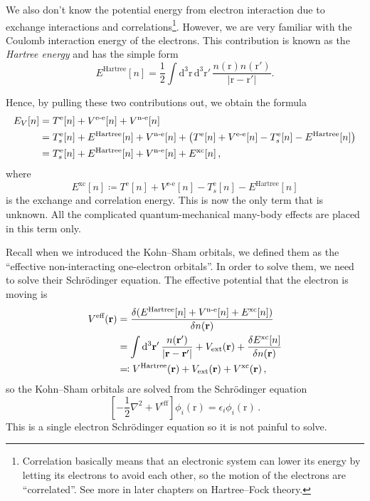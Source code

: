 \documentclass{article}
\theoremstyle{plain}\theoremheaderfont{\normalfont\itshape}\theorembodyfont{\rmfamily}\theoremseparator{.}\newtheorem*{rem}{Remark}\newtheorem*{ex}{Example}\newtheorem*{proof}{Proof}\newtheorem*{altp}{Alternative proof}
\theoremstyle{plain}\theoremheaderfont{\normalfont\bfseries}\theorembodyfont{\rmfamily}\theoremseparator{.}\newtheorem{thm}{Theorem}[section]\newtheorem{lem}[thm]{Lemma}\newtheorem{prop}[thm]{Proposition}\newtheorem*{cor}{Corollary}\newtheorem{defn}[thm]{Definition}\newtheorem{clm}[thm]{Claim}\newtheorem{clminproof}{Claim}\newtheorem{pos}{Postulate}[section]
\theoremstyle{break}\theoremheaderfont{\normalfont\itshape}\theorembodyfont{\rmfamily}\theoremseparator{.\medskip}\newtheorem*{proofskip}{Proof}\newtheorem*{exs}{Examples}\newtheorem*{rems}{Remarks}
\theoremstyle{break}\theoremheaderfont{\normalfont\bfseries}\theorembodyfont{\rmfamily}\theoremseparator{.\medskip}\newtheorem{lemskip}[thm]{Lemma}\newtheorem{defnskip}[thm]{Definition}\newtheorem{propskip}[thm]{Proposition}\newtheorem{thmskip}[thm]{Theorem}
\numberwithin{equation}{section}
\newcommand{\dd}[2][]{\mathrm{d}^{#1} #2\,}
\newcommand{\vb}[1]{\bm{\mathrm{#1}}}
\newcommand{\abs}[1]{\left| #1 \right|}
\newcommand{\laplacian}{\nabla^2}
\newcommand{\e}{^{\text{e}}}
\begin{document}
    We also don't know the potential energy from electron interaction due to exchange interactions and correlations\footnote{Correlation basically means that an electronic system can lower its energy by letting its electrons to avoid each other, so the motion of the electrons are ``correlated''. See more in later chapters on Hartree--Fock theory.}. However, we are very familiar with the Coulomb interaction energy of the electrons. This contribution is known as the \textit{Hartree energy} and has the simple form
    \begin{equation}
        E^{\text{Hartree}}[n]=\frac{1}{2}\int\dd[3]{\vb{r}}\dd[3]{\vb{r}'}\frac{n(\vb{r})n(\vb{r}')}{\abs{\vb{r}-\vb{r}'}}.
    \end{equation}

    Hence, by pulling these two contributions out, we obtain the formula
    \begin{align}
        E_V[n]&=T\e[n]+V^{\text{e-e}}[n]+V^{\text{n-e}}[n]\notag\\
        &=T_s\e[n]+E^{\text{Hartree}}[n]+V^{\text{n-e}}[n]+\left(T\e[n]+V^{\text{e-e}}[n]-T_s\e[n]-E^{\text{Hartree}}[n]\right)\notag\\
        &=T_s\e[n]+E^{\text{Hartree}}[n]+V^{\text{n-e}}[n]+E^{\text{xc}}[n]\,,
    \end{align}
    where
    \begin{equation}
        E^{\text{xc}}[n]\coloneqq T\e[n]+V^{\text{e-e}}[n]-T_s\e[n]-E^{\text{Hartree}}[n]
    \end{equation}
    is the exchange and correlation energy. This is now the only term that is unknown. All the complicated quantum-mechanical many-body effects are placed in this term only.

    Recall when we introduced the Kohn--Sham orbitals, we defined them as the ``effective non-interacting one-electron orbitals''. In order to solve them, we need to solve their Schr\"{o}dinger equation. The effective potential that the electron is moving is
    \begin{align}
        V^{\text{eff}}(\vb{r})&=\frac{\delta(E^{\text{Hartree}}[n]+V^{\text{n-e}}[n]+E^{\text{xc}}[n])}{\delta n(\vb{r})}\notag\\
        &=\int\dd[3]{\vb{r}'}\frac{n(\vb{r}')}{\abs{\vb{r}-\vb{r}'}}+V_{\text{ext}}(\vb{r})+\frac{\delta E^{\text{xc}}[n]}{\delta n(\vb{r})}\notag\\
        &\eqqcolon V^{\text{Hartree}}(\vb{r})+V_{\text{ext}}(\vb{r})+V^{\text{xc}}(\vb{r})\,,
    \end{align}
    so the Kohn--Sham orbitals are solved from the Schr\"{o}dinger equation
    \begin{equation}
        \left[-\frac{1}{2}\laplacian+V^{\text{eff}}\right]\phi_i(\vb{r})=\epsilon_i\phi_i(\vb{r})\,.
    \end{equation}
    This is a single electron Schr\"{o}dinger equation so it is not painful to solve.
\end{document}
